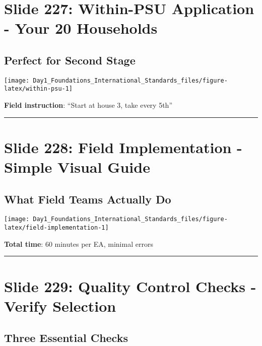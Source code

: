 \documentclass[
]{article}
\begin{document}
\section{Slide 227: Within-PSU Application - Your 20
Households}\label{slide-227-within-psu-application---your-20-households}

\subsection{Perfect for Second Stage}\label{perfect-for-second-stage}

\texttt{[image: Day1\_Foundations\_International\_Standards\_files/figure-latex/within-psu-1]}

\textbf{Field instruction}: ``Start at house 3, take every 5th''

\begin{center}\rule{0.5\linewidth}{0.5pt}\end{center}

\section{Slide 228: Field Implementation - Simple Visual
Guide}\label{slide-228-field-implementation---simple-visual-guide}

\subsection{What Field Teams Actually
Do}\label{what-field-teams-actually-do}

\texttt{[image: Day1\_Foundations\_International\_Standards\_files/figure-latex/field-implementation-1]}

\textbf{Total time}: 60 minutes per EA, minimal errors

\begin{center}\rule{0.5\linewidth}{0.5pt}\end{center}

\section{Slide 229: Quality Control Checks - Verify
Selection}\label{slide-229-quality-control-checks---verify-selection}

\subsection{Three Essential Checks}\label{three-essential-checks}
\end{document}
